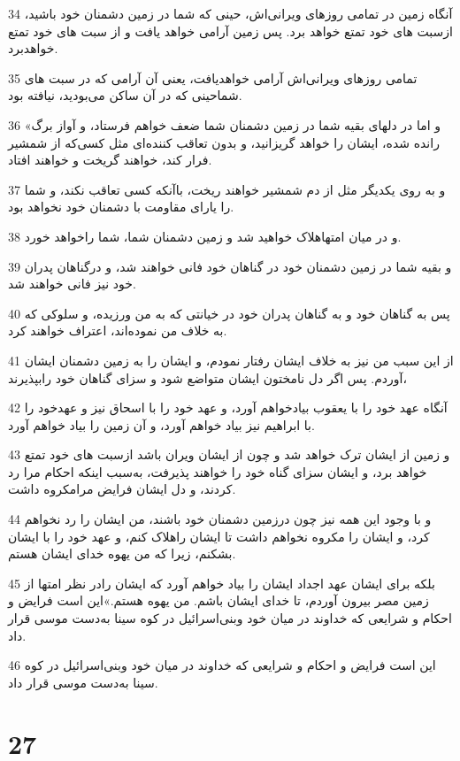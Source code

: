 \par 34 آنگاه زمین در تمامی روزهای ویرانی‌اش، حینی که شما در زمین دشمنان خود باشید، ازسبت های خود تمتع خواهد برد. پس زمین آرامی خواهد یافت و از سبت های خود تمتع خواهدبرد.
\par 35 تمامی روزهای ویرانی‌اش آرامی خواهدیافت، یعنی آن آرامی که در سبت های شماحینی که در آن ساکن می‌بودید، نیافته بود.
\par 36 «و اما در دلهای بقیه شما در زمین دشمنان شما ضعف خواهم فرستاد، و آواز برگ رانده شده، ایشان را خواهد گریزانید، و بدون تعاقب کننده‌ای مثل کسی‌که از شمشیر فرار کند، خواهند گریخت و خواهند افتاد.
\par 37 و به روی یکدیگر مثل از دم شمشیر خواهند ریخت، باآنکه کسی تعاقب نکند، و شما را یارای مقاومت با دشمنان خود نخواهد بود.
\par 38 و در میان امتهاهلاک خواهید شد و زمین دشمنان شما، شما راخواهد خورد.
\par 39 و بقیه شما در زمین دشمنان خود در گناهان خود فانی خواهند شد، و درگناهان پدران خود نیز فانی خواهند شد.
\par 40 پس به گناهان خود و به گناهان پدران خود در خیانتی که به من ورزیده، و سلوکی که به خلاف من نموده‌اند، اعتراف خواهند کرد.
\par 41 از این سبب من نیز به خلاف ایشان رفتار نمودم، و ایشان را به زمین دشمنان ایشان آوردم. پس اگر دل نامختون ایشان متواضع شود و سزای گناهان خود رابپذیرند،
\par 42 آنگاه عهد خود را با یعقوب بیادخواهم آورد، و عهد خود را با اسحاق نیز و عهدخود را با ابراهیم نیز بیاد خواهم آورد، و آن زمین را بیاد خواهم آورد.
\par 43 و زمین از ایشان ترک خواهد شد و چون از ایشان ویران باشد ازسبت های خود تمتع خواهد برد، و ایشان سزای گناه خود را خواهند پذیرفت، به‌سبب اینکه احکام مرا رد کردند، و دل ایشان فرایض مرامکروه داشت.
\par 44 و با وجود این همه نیز چون درزمین دشمنان خود باشند، من ایشان را رد نخواهم کرد، و ایشان را مکروه نخواهم داشت تا ایشان راهلاک کنم، و عهد خود را با ایشان بشکنم، زیرا که من یهوه خدای ایشان هستم.
\par 45 بلکه برای ایشان عهد اجداد ایشان را بیاد خواهم آورد که ایشان رادر نظر امتها از زمین مصر بیرون آوردم، تا خدای ایشان باشم. من یهوه هستم.»این است فرایض و احکام و شرایعی که خداوند در میان خود وبنی‌اسرائیل در کوه سینا به‌دست موسی قرار داد.
\par 46 این است فرایض و احکام و شرایعی که خداوند در میان خود وبنی‌اسرائیل در کوه سینا به‌دست موسی قرار داد.
 
\chapter{27}

